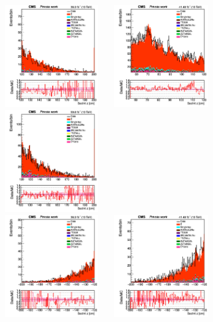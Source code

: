 \documentclass{cernatlasnote}
\begin{document}
\begin{figure}[htp]
\centering
\includegraphics[width=4.6cm, height=4.4cm]{images/emu_channel/2016/16_Plots_for_r_z/SecInt_z_Selec_eta_z_plus_120_200_Linear.png}
\includegraphics[width=4.6cm, height=4.4cm]{images/emu_channel/2017/17_Plots_for_r_z/SecInt_z_Selec_eta_plus_55_120_Linear.png}
 \includegraphics[width=4.6cm, height=4.4cm]{images/emu_channel/2018/18_Plots_for_r_z/SecInt_z_Selec_eta_z_120_200_Linear.png}\\
 \includegraphics[width=4.6cm, height=4.4cm]{images/emu_channel/2016/16_Plots_for_r_z/SecInt_z_Selec_eta_z_minus_120_200_Linear.png}
\includegraphics[width=4.6cm, height=4.4cm]{images/emu_channel/2017/17_Plots_for_r_z/SecInt_z_Selec_eta_minus_120_200_Linear.png}

\end{figure}
\end{document}
